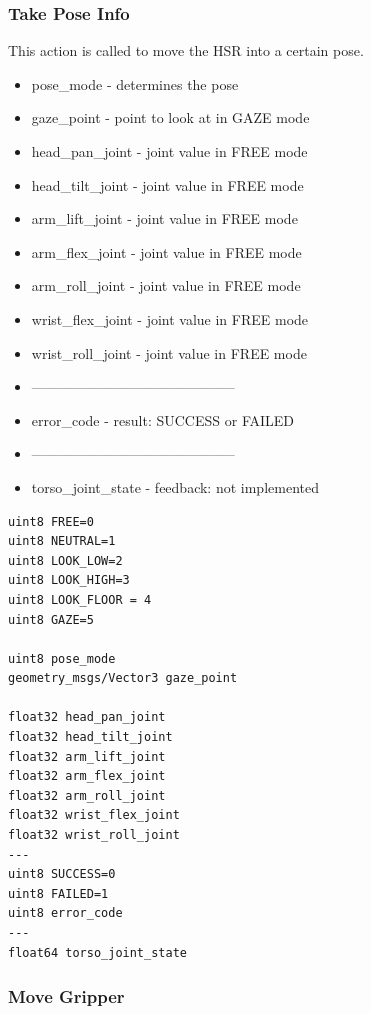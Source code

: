 \documentclass[main.tex]{subfiles}
\begin{document}
					\subsubsection{Take Pose Info}
						This action is called to move the HSR into a certain pose.
						\begin{itemize}
							\item pose\_mode - determines the pose
							\item gaze\_point - point to look at in GAZE mode
							\item head\_pan\_joint - joint value in FREE mode
							\item head\_tilt\_joint - joint value in FREE mode
							\item arm\_lift\_joint - joint value in FREE mode
							\item arm\_flex\_joint - joint value in FREE mode
							\item arm\_roll\_joint - joint value in FREE mode
							\item wrist\_flex\_joint - joint value in FREE mode
							\item wrist\_roll\_joint - joint value in FREE mode
							\item --------------------------------------------
							\item error\_code - result: SUCCESS or FAILED
							\item --------------------------------------------
							\item torso\_joint\_state - feedback: not implemented
						\end{itemize}
					\begin{lstlisting}
uint8 FREE=0
uint8 NEUTRAL=1
uint8 LOOK_LOW=2
uint8 LOOK_HIGH=3
uint8 LOOK_FLOOR = 4
uint8 GAZE=5
		
uint8 pose_mode
geometry_msgs/Vector3 gaze_point
		
float32 head_pan_joint
float32 head_tilt_joint
float32 arm_lift_joint
float32 arm_flex_joint
float32 arm_roll_joint
float32 wrist_flex_joint
float32 wrist_roll_joint
---
uint8 SUCCESS=0
uint8 FAILED=1
uint8 error_code
---
float64 torso_joint_state
\end{lstlisting}
				\subsubsection{Move Gripper}
				\label{msg_move_gripper}
\end{document}
